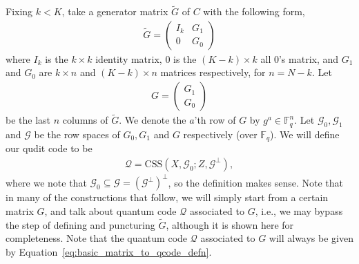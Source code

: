 \documentclass[11pt]{article}
\theoremstyle{definition}
\newcommand{\CSS}{\text{CSS}}
\newcommand{\bbF}{\mathbb{F}}
\newcommand{\cG}{\mathcal{G}}
\newcommand{\qcode}{\mathcal{Q}}
\newcommand{\K}{K}
\begin{document}
Fixing $k < \K$, take a generator matrix $\tilde G$ of $C$ with the following form,
\begin{align}
    \tilde{G} = \begin{pmatrix}
        I_k & G_1 \\
        0 & G_0
    \end{pmatrix}
\end{align}
where $I_k$ is the $k\times k$ identity matrix, $0$ is the $(\K-k) \times k$ all $0$'s matrix, and $G_1$ and $G_0$ are $k \times n$ and $(\K-k) \times n$ matrices respectively, for $n = N-k$. 
Let 
\begin{align}
    G = \begin{pmatrix}
        G_1 \\ G_0
    \end{pmatrix}
\end{align}
be the last $n$ columns of $\tilde{G}$. 
We denote the $a$'th row of $G$ by $g^a \in \bbF_q^n$. 
Let $\cG_0, \cG_1$ and $\cG$ be the row spaces of $G_0, G_1$ and $G$ respectively (over $\mathbb{F}_q$). 
We will define our qudit code to be 
\begin{align}\label{eq:basic_matrix_to_qcode_defn}
    \qcode = \CSS(X, \cG_0; Z, \cG^\perp),
\end{align}
where we note that $\mathcal{G}_0 \subseteq \mathcal{G} = (\mathcal{G}^\perp)^\perp$, so the definition makes sense. Note that in many of the constructions that follow, we will simply start from a certain matrix $G$, and talk about quantum code $\qcode$ associated to $G$, i.e., we may bypass the step of defining and puncturing $\tilde{G}$, although it is shown here for completeness. Note that the quantum code $\qcode$ associated to $G$ will always be given by Equation~\eqref{eq:basic_matrix_to_qcode_defn}.
\end{document}
